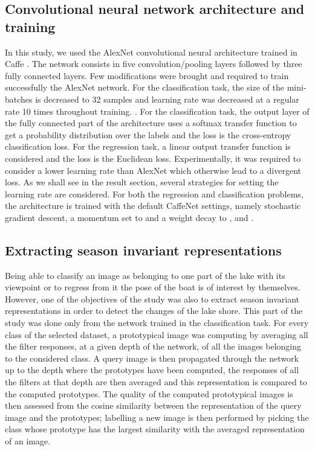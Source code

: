 \subsection{Convolutional neural network architecture and training}

In this study, we used the AlexNet convolutional neural architecture \cite{NIPS2012_4824} trained in Caffe \cite{jia2014caffe}. The network consists in five convolution/pooling layers followed by three fully connected layers. Few modifications were brought and required to train successfully the AlexNet network. For the classification task, the size of the mini-batches is decreased to 32 samples and learning rate was decreased at a regular rate 10 times throughout training. . For the classification task, the output layer of the fully connected part of the architecture uses a softmax transfer function to get a probability distribution over the labels and the loss is the cross-entropy classification loss. For the regression task, a linear output transfer function is considered and the loss is the Euclidean loss. Experimentally, it was required to consider a lower learning rate than AlexNet which otherwise lead to a divergent loss. As we shall see in the result section, several strategies for setting the learning rate are considered. For both the regression and classification problems, the architecture is trained with the default CaffeNet settings, namely stochastic gradient descent, a momentum set to  and a weight decay to , and .


\subsection{Extracting season invariant representations}

Being able to classify an image as belonging to one part of the lake with its viewpoint or to regress from it the pose of the boat is of interest by themselves. However, one of the objectives of the study was also to extract season invariant representations in order to detect the changes of the lake shore. This part of the study was done only from the network trained in the classification task. For every class of the selected dataset, a prototypical image was computing by averaging all the filter responses, at a given depth of the network, of all the images belonging to the considered class. A query image is then propagated through the network up to the depth where the prototypes have been computed, the responses of all the filters at that depth are then averaged and this representation is compared to the computed prototypes. The quality of the computed prototypical images is then assessed from the cosine similarity between the representation of the query image and the prototypes; labelling a new image is then performed by picking the class whose prototype has the largest similarity with the averaged representation of an image.
